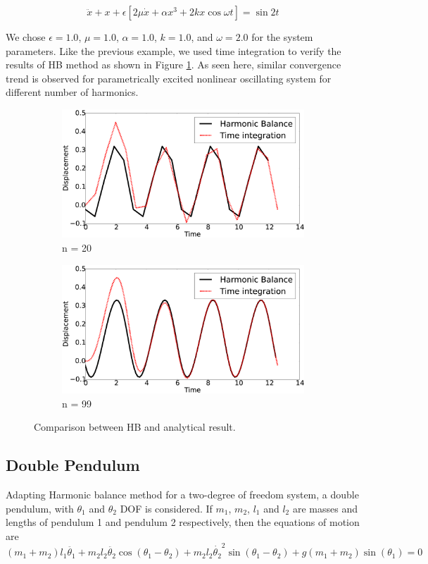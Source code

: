\documentclass[12pt, a4paper]{extarticle}
\begin{document}
\begin{equation}\label{eq:3GE}
	\ddot{x} + x + \epsilon \left[ 2 \mu \dot{x} + \alpha x^3 + 2 k x \cos \omega t \right] = \sin 2t	
\end{equation}

We chose $\epsilon = 1.0$, $\mu = 1.0$, $\alpha = 1.0$, $k = 1.0$, and $\omega = 2.0$ for the system parameters. Like the previous example, we used time integration to verify the results of HB method as shown in Figure \ref{fig:R3}. As seen here, similar convergence trend is observed for parametrically excited nonlinear oscillating system for different number of harmonics.

\begin{figure}[H]
	\centering
	\begin{subfigure}[h]{8.0 cm}
		\includegraphics[width=8.0 cm]{figure/3N20.eps}
		\caption{n = 20}
	\end{subfigure}
	\begin{subfigure}[h]{8.0 cm}
        \includegraphics[width=8.0 cm]{figure/3N99.eps}
		\caption{n = 99}
    \end{subfigure}
    \caption{Comparison between HB and analytical result.}
    \label{fig:R3}
\end{figure}
\subsection{Double Pendulum}
Adapting Harmonic balance method for a two-degree of freedom system, a double pendulum, with $\theta_1$ and $\theta_2$ DOF is considered. If $m_1$, $m_2$, $l_1$ and $l_2$ are masses and lengths of pendulum 1 and pendulum 2 respectively, then the equations of motion are
\begin{equation}
(m_1+m_2) l_1 \ddot{\theta_1} + m_2 l_2 \ddot{\theta_2} \cos( \theta_1 - \theta_2 ) + m_2  l_2 \dot{ \theta_2 }^2 \sin( \theta_1 - \theta_2 )+g (m_1+m_2)  \sin( \theta_1) = 0
\end{equation}
\end{document}

